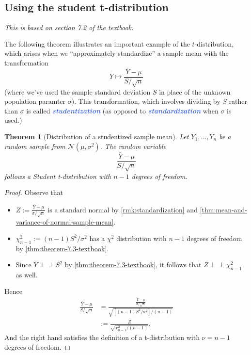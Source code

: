 \documentclass[10pt]{article}
\newtheorem{theorem}{Theorem}
\theoremstyle{definition}
\newcommand{\1}[1]{\textbf{1}_{\left[#1\right]}} %
\newcommand{\indep}{\perp \!\!\! \perp}  %
\newcommand{\demph}[1]{\textcolor{RoyalBlue}{\textbf{\slshape #1}}} %
\begin{document}
\subsection{Using the student t-distribution}
\label{sec:using-student-t-distribution}
\textit{This is based on section 7.2 of the textbook.}

The following theorem illustrates an important example of the
$t$-distribution, which arises when we ``approximately standardize'' a sample
mean with the transformation
\begin{equation*}
  \overline{Y} \mapsto \frac{\overline{Y} - \mu}{S/\sqrt{n}}
\end{equation*}
(where we've used the sample standard deviation $S$ in place of the unknown
population paramter $\sigma$). This transformation, which involves dividing by
$S$ rather than $\sigma$ is called \demph{studentization} (as opposed to
\demph{standardization} when $\sigma$ is used.)


\begin{theorem}[Distribution of a studentized sample mean]
  \label{thm:approximate-standardization-is-t-distn}
  Let $Y_{1},\ldots,Y_{n}$ be a random sample from
  $\mathcal{N}(\mu,\sigma^{2})$. The random variable 
  \begin{equation*}
    \frac{\overline{Y}-\mu}{S/\sqrt{n}}
  \end{equation*}
  follows a Student t-distribution with $n-1$ degrees of freedom.
\end{theorem}

\begin{proof}
  Observe that
  \begin{itemize}
    \item $Z := \frac{\overline{Y}-\mu}{\sigma/\sqrt{n}}$ is a standard normal by
    \cref{rmk:standardization} and \cref{thm:mean-and-variance-of-normal-sample-mean}.
    \item $\chi^{2}_{n-1} := (n-1)S^{2}/\sigma^{2}$ has a $\chi^{2}$
    distribution with $n-1$ degrees of freedom by
    \cref{thm:theorem-7.3-textbook}.
    \item Since $\overline{Y}\indep S^{2}$ by \cref{thm:theorem-7.3-textbook},
    it follows that $Z\indep \chi^{2}_{n-1}$ as well.
  \end{itemize}
  Hence
  \begin{align*}
    \frac{\overline{Y}-\mu}{S/\sqrt{n}}
    &= \frac{\frac{\overline{Y}-\mu}{\sigma/\sqrt{n}}}{\sqrt{\left[ (n-1)S^{2}/\sigma^{2} \right]/(n-1) }} \\
    &:= \frac{Z}{\sqrt{\chi^{2}_{n-1}/(n-1)}},
  \end{align*}
  And the right hand satisfies the definition of a t-distribution with
  $\nu=n-1$ degrees of freedom.
\end{proof}
\end{document}
